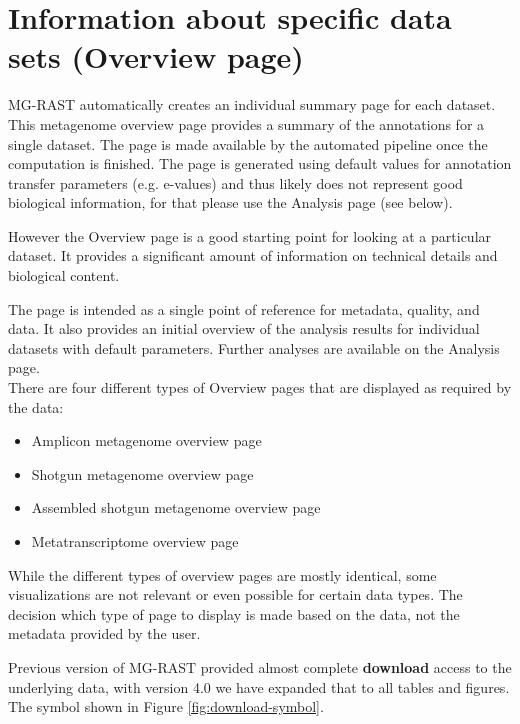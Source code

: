 \documentclass[12pt,fullpage]{report}
\begin{document}
\section{Information about specific data sets (Overview page)}

MG-RAST automatically creates an individual summary page for each dataset. This metagenome overview page provides a summary of the annotations for a single dataset. The page is made available by the automated pipeline once the computation is finished. The page is generated using default values for annotation transfer parameters (e.g. e-values) and thus likely does not represent good biological information, for that please use the Analysis page (see below).

However the Overview page is a good starting point for looking at a particular dataset. It provides a significant amount of information on technical details and biological content.

The page is intended as a single point of reference for metadata, quality, and data. It also provides an initial overview of the analysis results for individual datasets with default parameters. Further analyses are available on the Analysis page.\\

There are four different types of Overview pages that are displayed as required by the data:

\begin{itemize}
\item Amplicon metagenome overview page
\item Shotgun metagenome overview page
\item Assembled shotgun metagenome overview page
\item Metatranscriptome overview page
\end{itemize}

While the different types of overview pages are mostly identical, some visualizations are not relevant or even possible for certain data types. The decision which type of page to display is made based on the data, not the metadata provided by the user.


Previous version of MG-RAST provided almost complete \textbf{download} access to the underlying data, with version 4.0 we have expanded that to all tables and figures. The symbol shown in Figure \ref{fig:download-symbol}.
\end{document}
